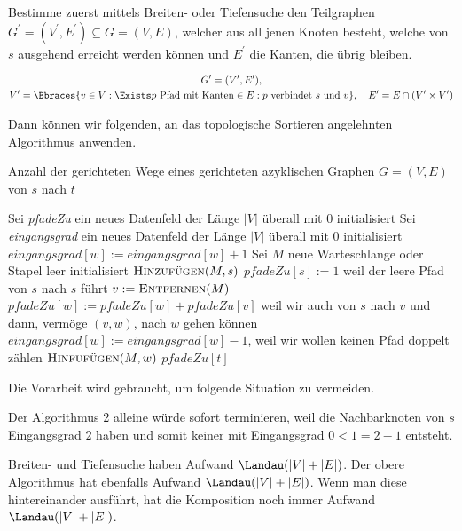 \begin{solution}

Bestimme zuerst mittels Breiten- oder Tiefensuche den Teilgraphen $G^\prime = (V^\prime, E^\prime) \subseteq G = (V, E)$, welcher aus all jenen Knoten besteht, welche von $s$ ausgehend erreicht werden können und $E^\prime$ die Kanten, die übrig bleiben.

\begin{gather*}
    G^\prime = (V^\prime, E^\prime), \\
    V^\prime = \Bbraces{v \in V: \Exists p ~\text{Pfad mit Kanten} \in E: p ~\text{verbindet}~ s ~\text{und}~ v},
    \quad
    E^\prime = E\cap (V^\prime \times V^\prime)
\end{gather*}

Dann können wir folgenden, an das topologische Sortieren angelehnten Algorithmus anwenden.

\phantom{}
	\begin{algorithm}
		\caption{Anzahl der gerichteten Wege eines gerichteten azyklischen Graphen $G = (V, E)$ von $s$ nach $t$}
		\begin{algorithmic}[1]
			\State Sei \textit{pfadeZu} ein neues Datenfeld der Länge $|V|$ überall mit $0$ initialisiert
			\State Sei \textit{eingangsgrad} ein neues Datenfeld der Länge $|V|$ überall mit $0$ initialisiert
				\State $\textit{eingangsgrad}[w] := \textit{eingangsgrad}[w] + 1$
			\EndFor
			\State Sei $M$ neue Warteschlange oder Stapel leer initialisiert
			\State $\textsc{Hinzufügen}(M,s)$
			\State $\textit{pfadeZu}[s] := 1$ weil der leere Pfad von $s$ nach $s$ führt
				\State $v := \textsc{Entfernen}(M)$
					\State $\textit{pfadeZu}[w] := \textit{pfadeZu}[w] + \textit{pfadeZu}[v]$ weil wir auch von $s$ nach $v$ und dann, vermöge $(v, w)$, nach $w$ gehen können
					\State $\textit{eingangsgrad}[w] := \textit{eingangsgrad}[w] - 1$, weil wir wollen keinen Pfad doppelt zählen
						\State $\textsc{Hinfufügen}(M, w)$
					\EndIf
				\EndFor
			\EndWhile
			\State \Return $\textit{pfadeZu}[t]$
			\EndProcedure
		\end{algorithmic}
	\end{algorithm}
\end{solution}

Die Vorarbeit wird gebraucht, um folgende Situation zu vermeiden.


Der Algorithmus 2 alleine würde sofort terminieren, weil die Nachbarknoten von $s$ Eingangsgrad $2$ haben und somit keiner mit Eingangsgrad $0 < 1 = 2 - 1$ entsteht.

Breiten- und Tiefensuche haben Aufwand $\Landau(|V| + |E|)$.
Der obere Algorithmus hat ebenfalls Aufwand $\Landau(|V| + |E|)$.
Wenn man diese hintereinander ausführt, hat die Komposition noch immer Aufwand $\Landau(|V| + |E|)$.


\FloatBarrier
